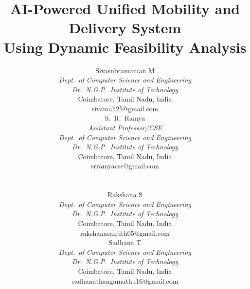 \documentclass[conference]{IEEEtran}
\begin{document}
\title{AI-Powered Unified Mobility and Delivery System\\ Using Dynamic Feasibility Analysis}

\author{%
\begin{minipage}{0.48\linewidth}\centering
Sivasubramanian M\\
\textit{Dept.\ of Computer Science and Engineering}\\
\textit{Dr.\ N.G.P.\ Institute of Technology}\\
Coimbatore, Tamil Nadu, India\\
sivamah25@gmail.com
\end{minipage}%
\begin{minipage}{0.48\linewidth}\centering
S.\ R.\ Ramya\\
\textit{Assistant Professor/CSE}\\
\textit{Dept.\ of Computer Science and Engineering}\\
\textit{Dr.\ N.G.P.\ Institute of Technology}\\
Coimbatore, Tamil Nadu, India\\
srramyacse@gmail.com
\end{minipage}%
\\[1.0em]
\begin{minipage}{0.48\linewidth}\centering
Rakshana S\\
\textit{Dept.\ of Computer Science and Engineering}\\
\textit{Dr.\ N.G.P.\ Institute of Technology}\\
Coimbatore, Tamil Nadu, India\\
rakshanasanjith05@gmail.com
\end{minipage}%
\begin{minipage}{0.48\linewidth}\centering
Sadhana T\\
\textit{Dept.\ of Computer Science and Engineering}\\
\textit{Dr.\ N.G.P.\ Institute of Technology}\\
Coimbatore, Tamil Nadu, India\\
sadhanathangamuthu16@gmail.com
\end{minipage}%
}

\maketitle
\end{document}
